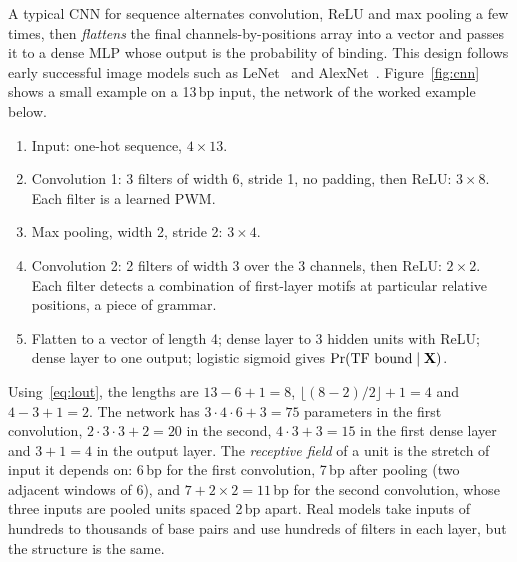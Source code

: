 A typical CNN for sequence alternates convolution, ReLU and max pooling a few times, then \emph{flattens} the final channels-by-positions array into a vector and passes it to a dense MLP whose output is the probability of binding. This design follows early successful image models such as LeNet~\citep{lecun1998} and AlexNet~\citep{krizhevsky2012}. Figure~\ref{fig:cnn} shows a small example on a 13\,bp input, the network of the worked example below.
\begin{enumerate}
  \item Input: one-hot sequence, $4\times13$.
  \item Convolution 1: 3 filters of width 6, stride 1, no padding, then ReLU: $3\times8$. Each filter is a learned PWM.
  \item Max pooling, width 2, stride 2: $3\times4$.
  \item Convolution 2: 2 filters of width 3 over the 3 channels, then ReLU: $2\times2$. Each filter detects a combination of first-layer motifs at particular relative positions, a piece of grammar.
  \item Flatten to a vector of length 4; dense layer to 3 hidden units with ReLU; dense layer to one output; logistic sigmoid gives $\Pr(\text{TF bound}\mid\mathbf{X})$.
\end{enumerate}
Using~\eqref{eq:lout}, the lengths are $13-6+1=8$, $\lfloor(8-2)/2\rfloor+1=4$ and $4-3+1=2$. The network has $3\cdot4\cdot6+3=75$ parameters in the first convolution, $2\cdot3\cdot3+2=20$ in the second, $4\cdot3+3=15$ in the first dense layer and $3+1=4$ in the output layer. The \emph{receptive field} of a unit is the stretch of input it depends on: 6\,bp for the first convolution, 7\,bp after pooling (two adjacent windows of 6), and $7+2\times2=11$\,bp for the second convolution, whose three inputs are pooled units spaced 2\,bp apart. Real models take inputs of hundreds to thousands of base pairs and use hundreds of filters in each layer, but the structure is the same.

